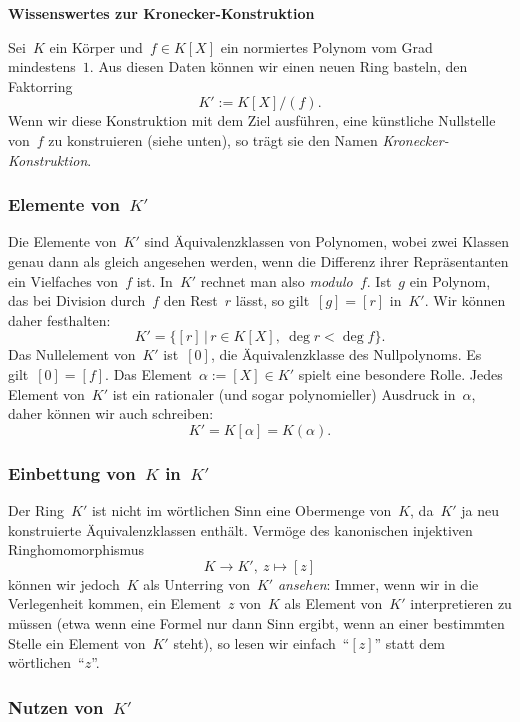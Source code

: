 \documentclass{../../alg2/algblatt}
\begin{document}
\begin{center}\Large \sffamily\textbf{Wissenswertes zur Kronecker-Konstruktion}\end{center}

Sei~$K$ ein Körper und~$f \in K[X]$ ein normiertes Polynom vom Grad
mindestens~$1$. Aus diesen Daten können wir einen neuen Ring basteln, den Faktorring
\[ K' := K[X]/(f). \]
Wenn wir diese Konstruktion mit dem Ziel ausführen, eine künstliche Nullstelle
von~$f$ zu konstruieren (siehe unten), so trägt sie den Namen \emph{Kronecker-Konstruktion}.


\subsubsection*{Elemente von~$K'$}

Die Elemente von~$K'$ sind Äquivalenzklassen von Polynomen, wobei zwei Klassen
genau dann als gleich angesehen werden, wenn die Differenz ihrer Repräsentanten
ein Vielfaches von~$f$ ist. In~$K'$ rechnet man also \emph{modulo~$f$}. Ist~$g$
ein Polynom, das bei Division durch~$f$ den Rest~$r$ lässt, so gilt~$[g] = [r]$
in~$K'$. Wir können daher festhalten:
\[ K' = \{ [r] \,|\, r \in K[X],\ \deg r < \deg f \}. \]
Das Nullelement von~$K'$ ist~$[0]$, die Äquivalenzklasse des Nullpolynoms. Es
gilt~$[0] = [f]$. Das Element~$\alpha := [X] \in K'$ spielt eine besondere
Rolle. Jedes Element von~$K'$ ist ein rationaler (und sogar polynomieller)
Ausdruck in~$\alpha$, daher können wir auch schreiben:
\[ K' = K[\alpha] = K(\alpha). \]


\subsubsection*{Einbettung von~$K$ in~$K'$}

Der Ring~$K'$ ist nicht im wörtlichen Sinn eine Obermenge von~$K$, da~$K'$ ja
neu kon\-stru\-ier\-te Äquivalenzklassen enthält. Vermöge des kanonischen injektiven
Ringhomomorphismus
\[ K \longrightarrow K',\ z \longmapsto [z] \]
können wir jedoch~$K$ als Unterring von~$K'$ \emph{ansehen}: Immer, wenn wir in
die Verlegenheit kommen, ein Element~$z$ von~$K$ als Element von~$K'$
interpretieren zu müssen (etwa wenn eine Formel nur dann Sinn ergibt, wenn an
einer bestimmten Stelle ein Element von~$K'$ steht), so lesen wir
einfach~"`$[z]$"' statt dem wörtlichen~"`$z$"'.


\subsubsection*{Nutzen von~$K'$}
\end{document}
